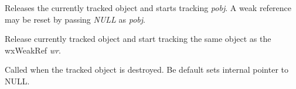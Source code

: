 
Releases the currently tracked object and starts tracking {\it pobj}.
A weak reference may be reset by passing {\it NULL} as {\it pobj}.


\label{wxweakrefoperatorassign2}


Release currently tracked object and start tracking the same object as
the wxWeakRef {\it wr}.


\label{wxweakrefonobjectdestroy}


Called when the tracked object is destroyed. Be default sets
internal pointer to NULL.

